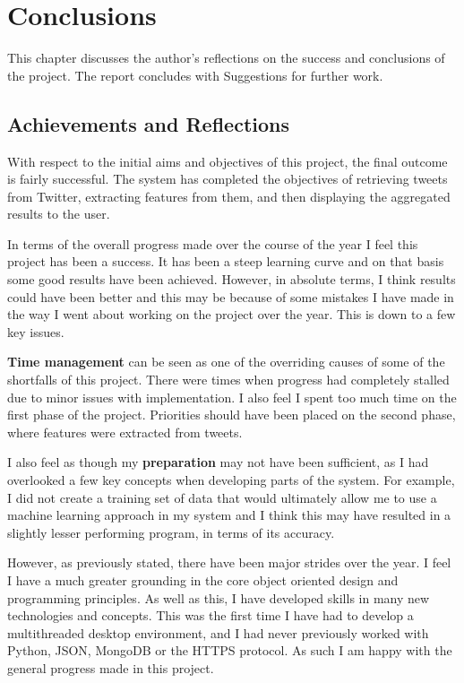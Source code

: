 \chapter{Conclusions}
\label{cha:conclusion}
This chapter discusses the author's reflections on the success and conclusions of the project. The report concludes with Suggestions for further work.

\section{Achievements and Reflections}
With respect to the initial aims and objectives of this project, the final outcome is fairly successful. The system has completed the objectives of retrieving tweets from Twitter, extracting features from them, and then displaying the aggregated results to the user.

In terms of the overall progress made over the course of the year I feel this project has been a success. It has been a steep learning curve and on that basis some good results have been achieved. However, in absolute terms, I think results could have been better and this may be because of some mistakes I have made in the way I went about working on the project over the year. This is down to a few key issues.

\textbf{Time management} can be seen as one of the overriding causes of some of the shortfalls of this project. There were times when progress had completely stalled due to minor issues with implementation. I also feel I spent too much time on the first phase of the project. Priorities should have been placed on the second phase, where features were extracted from tweets.

I also feel as though my \textbf{preparation} may not have been sufficient, as I had overlooked a few key concepts when developing parts of the system. For example, I did not create a training set of data that would ultimately allow me to use a machine learning approach in my system and I think this may have resulted in a slightly lesser performing program, in terms of its accuracy.

However, as previously stated, there have been major strides over the year. I feel I have a much greater grounding in the core object oriented design and programming principles. As well as this, I have developed skills in many new technologies and concepts. This was the first time I have had to develop a multithreaded desktop environment, and I had never previously worked with Python, JSON, MongoDB or the HTTPS protocol. As such I am happy with the general progress made in this project.

